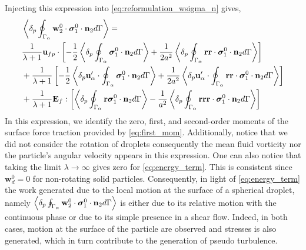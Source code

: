 Injecting this expression into \ref{eq:reformulation_wsigma_n} gives, 
\begin{align}
    &\pSavg{\textbf{w}_2^0 \cdot \bm{\sigma}_1^0\cdot\textbf{n}_2}
    =  \\
    &\frac{1}{\lambda+1}\textbf{u}_{fp} \cdot \left[
        -\frac{1}{2}\pSavg{ \bm{\sigma}_1^0\cdot\textbf{n}_2}
        + \frac{1}{2a^2}
        \pSavg{\textbf{rr}\cdot \bm{\sigma}_1^0\cdot\textbf{n}_2}
    \right]\nonumber
    \\
    &+ \frac{1}{\lambda+1} \left[
        -\frac{1}{2}
        \pavg{\textbf{u}_\alpha' \cdot  \intS{\bm{\sigma}_1^0\cdot\textbf{n}_2}}
        + \frac{1}{2a^2}
        \pavg{\textbf{u}_\alpha' \cdot \intS{\textbf{rr}\cdot \bm{\sigma}_1^0\cdot\textbf{n}_2}}
    \right] \nonumber
    \\
    &+ \frac{1}{\lambda + 1} \textbf{E}_{f} : \left[ 
         \pSavg{\textbf{r} \bm{\sigma}_1^0\cdot\textbf{n}_2}
         -\frac{1}{a^2} 
         \pSavg{ \textbf{rrr} \cdot \bm{\sigma}_1^0\cdot\textbf{n}_2}
         \right]
    \label{eq:energy_term}
\end{align}
In this expression, we identify the zero, first, and second-order moments of the surface force traction provided by \ref{eq:first_mom}. 
Additionally, notice that we did not consider the rotation of droplets consequently the mean fluid vorticity nor the particle's angular velocity appears in this expression. 
One can also notice that taking the limit $\lambda \to \infty$ gives zero for \ref{eq:energy_term}. 
This is consistent since $\textbf{w}_d^0 = 0$ for non-rotating solid particles. 
Consequently, in light of \ref{eq:energy_term} the work generated due to the local motion at the surface of a spherical droplet, namely  $\left<\delta_p \oint_{\Gamma_{\alpha}} \textbf{w}_2^0 \cdot \bm{\sigma}_1^0\cdot\textbf{n}_2 d\Gamma\right>$ is either due to its relative motion with the continuous phase or due to its simple presence in a shear flow. 
Indeed, in both cases, motion at the surface of the particle are observed and stresses is also generated, which in turn contribute to the generation of pseudo turbulence. 
